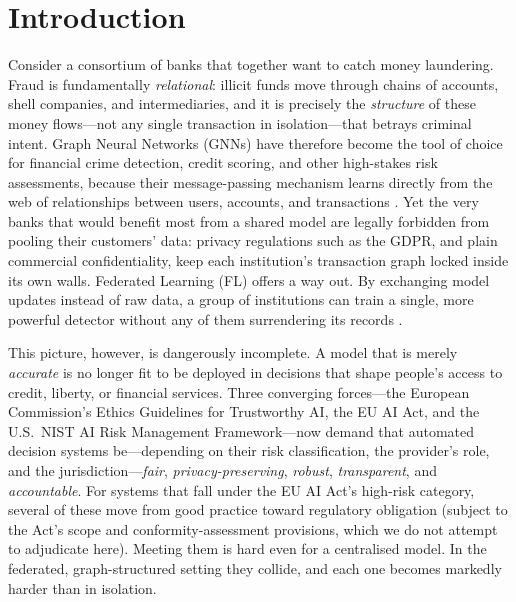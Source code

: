 \documentclass[pdflatex,sn-mathphys-num]{sn-jnl}
\theoremstyle{thmstyleone}%
\theoremstyle{thmstyletwo}%
\theoremstyle{thmstylethree}%
\begin{document}

\maketitle

\section{Introduction}
\label{sec:intro}

\noindent Consider a consortium of banks that together want to catch money
laundering. Fraud is fundamentally \emph{relational}: illicit funds move through
chains of accounts, shell companies, and intermediaries, and it is precisely the
\emph{structure} of these money flows---not any single transaction in
isolation---that betrays criminal intent. Graph Neural Networks (GNNs) have
therefore become the tool of choice for financial crime detection, credit
scoring, and other high-stakes risk assessments, because their message-passing
mechanism learns directly from the web of relationships between users, accounts,
and transactions \cite{kipf2016semi,velickovic2017graph,dou2020enhancing}. Yet
the very banks that would benefit most from a shared model are legally forbidden
from pooling their customers' data: privacy regulations such as the GDPR, and
plain commercial confidentiality, keep each institution's transaction graph
locked inside its own walls. Federated Learning (FL) offers a way out. By
exchanging model updates instead of raw data, a group of institutions can train
a single, more powerful detector without any of them surrendering its records
\cite{mcmahan2017communication}.

This picture, however, is dangerously incomplete. A model that is merely
\emph{accurate} is no longer fit to be deployed in decisions that shape people's
access to credit, liberty, or financial services. Three converging forces---the
European Commission's Ethics Guidelines for Trustworthy AI, the EU AI Act, and
the U.S.\ NIST AI Risk Management Framework---now demand that automated
decision systems be---depending on their risk classification, the provider's
role, and the jurisdiction---\emph{fair}, \emph{privacy-preserving},
\emph{robust}, \emph{transparent}, and \emph{accountable}. For systems that fall
under the EU AI Act's high-risk category, several of these move from good
practice toward regulatory obligation (subject to the Act's scope and
conformity-assessment provisions, which we do not attempt to adjudicate here).
Meeting them is hard even for a centralised model. In the federated,
graph-structured setting they collide, and each one becomes markedly harder than
in isolation.
\end{document}
